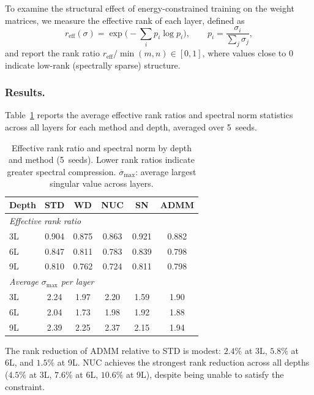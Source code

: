 \documentclass[a4paper,fleqn]{cas-sc}
\theoremstyle{remark}
\theoremstyle{definition}
\begin{document}
To examine the structural effect of energy-constrained training on the weight matrices, we measure the effective rank of each layer, defined as
\[
    r_{\text{eff}}(\sigma) = \exp\!\Big(-\sum_i p_i\log p_i\Big), \qquad p_i = \frac{\sigma_i}{\sum_j \sigma_j},
\]
and report the rank ratio $r_{\text{eff}}/\min(m,n)\in[0,1]$, where values close to $0$ indicate low-rank (spectrally sparse) structure.

\subsubsection{Results.}
Table~\ref{tab:spectral} reports the average effective rank ratios and spectral norm statistics across all layers for each method and depth, averaged over 5~seeds.

\begin{table}[ht]
\centering
\caption{Effective rank ratio and spectral norm by depth and method (5~seeds). Lower rank ratios indicate greater spectral compression. $\overline{\sigma}_{\max}$: average largest singular value across layers.}
\label{tab:spectral}
\begin{tabular}{lccccc}
\toprule
\textbf{Depth} & \textbf{STD} & \textbf{WD} & \textbf{NUC} & \textbf{SN} & \textbf{ADMM} \\
\midrule
\multicolumn{6}{l}{\emph{Effective rank ratio}} \\
3L & 0.904 & 0.875 & 0.863 & 0.921 & 0.882 \\
6L & 0.847 & 0.811 & 0.783 & 0.839 & 0.798 \\
9L & 0.810 & 0.762 & 0.724 & 0.811 & 0.798 \\
\midrule
\multicolumn{6}{l}{\emph{Average $\sigma_{\max}$ per layer}} \\
3L & 2.24 & 1.97 & 2.20 & 1.59 & 1.90 \\
6L & 2.04 & 1.73 & 1.98 & 1.92 & 1.88 \\
9L & 2.39 & 2.25 & 2.37 & 2.15 & 1.94 \\
\bottomrule
\end{tabular}
\end{table}

The rank reduction of ADMM relative to STD is modest: $2.4\%$ at 3L, $5.8\%$ at 6L, and $1.5\%$ at 9L. NUC achieves the strongest rank reduction across all depths ($4.5\%$ at 3L, $7.6\%$ at 6L, $10.6\%$ at 9L), despite being unable to satisfy the constraint.
\end{document}
